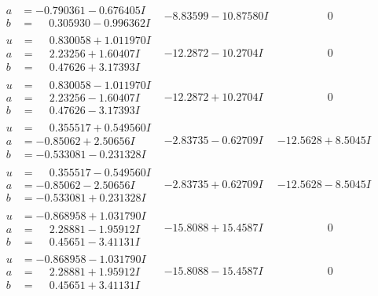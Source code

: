 \documentclass[1p]{elsarticle_modified}
\theoremstyle{definition}
\begin{document}
$$\begin{array}{c|c|c}
\begin{aligned}
a &= -0.790361 - 0.676405 I \\
b &= \phantom{-}0.305930 - 0.996362 I\end{aligned}
 & -8.83599 - 10.87580 I & \phantom{-0.000000 } 0 \\ \hline\begin{aligned}
u &= \phantom{-}0.830058 + 1.011970 I \\
a &= \phantom{-}2.23256 + 1.60407 I \\
b &= \phantom{-}0.47626 + 3.17393 I\end{aligned}
 & -12.2872 - 10.2704 I & \phantom{-0.000000 } 0 \\ \hline\begin{aligned}
u &= \phantom{-}0.830058 - 1.011970 I \\
a &= \phantom{-}2.23256 - 1.60407 I \\
b &= \phantom{-}0.47626 - 3.17393 I\end{aligned}
 & -12.2872 + 10.2704 I & \phantom{-0.000000 } 0 \\ \hline\begin{aligned}
u &= \phantom{-}0.355517 + 0.549560 I \\
a &= -0.85062 + 2.50656 I \\
b &= -0.533081 - 0.231328 I\end{aligned}
 & -2.83735 - 0.62709 I & -12.5628 + 8.5045 I \\ \hline\begin{aligned}
u &= \phantom{-}0.355517 - 0.549560 I \\
a &= -0.85062 - 2.50656 I \\
b &= -0.533081 + 0.231328 I\end{aligned}
 & -2.83735 + 0.62709 I & -12.5628 - 8.5045 I \\ \hline\begin{aligned}
u &= -0.868958 + 1.031790 I \\
a &= \phantom{-}2.28881 - 1.95912 I \\
b &= \phantom{-}0.45651 - 3.41131 I\end{aligned}
 & -15.8088 + 15.4587 I & \phantom{-0.000000 } 0 \\ \hline\begin{aligned}
u &= -0.868958 - 1.031790 I \\
a &= \phantom{-}2.28881 + 1.95912 I \\
b &= \phantom{-}0.45651 + 3.41131 I\end{aligned}
 & -15.8088 - 15.4587 I & \phantom{-0.000000 } 0\\

\end{array}$$
\end{document}
